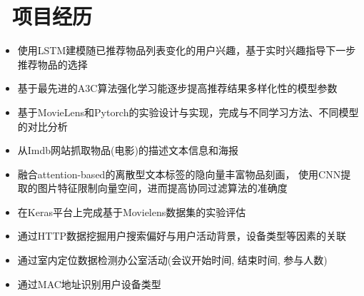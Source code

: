 \documentclass{resume}
\begin{document}
\section{\faUsers\ 项目经历}
\begin{onehalfspacing}
	\begin{itemize}
		\item 使用LSTM建模随已推荐物品列表变化的用户兴趣，基于实时兴趣指导下一步推荐物品的选择
		\item 基于最先进的A3C算法强化学习能逐步提高推荐结果多样化性的模型参数
		\item 基于MovieLens和Pytorch的实验设计与实现，完成与不同学习方法、不同模型的对比分析
	\end{itemize}
\end{onehalfspacing}
\begin{onehalfspacing}
\begin{itemize}
	\item 从Imdb网站抓取物品(电影)的描述文本信息和海报
	\item 融合attention-based的离散型文本标签的隐向量丰富物品刻画， 使用CNN提取的图片特征限制向量空间，进而提高协同过滤算法的准确度
	\item 在Keras平台上完成基于Movielens数据集的实验评估
\end{itemize}
\end{onehalfspacing}
\begin{onehalfspacing}
\begin{itemize}
  \item 通过HTTP数据挖掘用户搜索偏好与用户活动背景，设备类型等因素的关联
  \item 通过室内定位数据检测办公室活动(会议开始时间, 结束时间, 参与人数)
  \item 通过MAC地址识别用户设备类型
\end{itemize}
\end{onehalfspacing}
\end{document}
